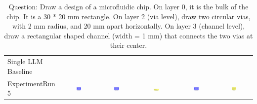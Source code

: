 \begin{table}
\begin{tabular}{@{}lccccc@{}}
    Single LLM Baseline \\
    ExperimentRun 5 & \includegraphics[width=0.15\textwidth]{./run_5/png/gpt-4o_results/MicrofluidicChip.png} & \includegraphics[width=0.15\textwidth]{./run_5/png/o1-preview_results/MicrofluidicChip.png} & \includegraphics[width=0.15\textwidth]{./run_5/png/claude-3-5-sonnet-20240620_results/MicrofluidicChip.png} & \includegraphics[width=0.15\textwidth]{./run_5/png/watsonx_meta-llama_llama-3-1-70b-instruct_results/MicrofluidicChip.png} & \includegraphics[width=0.15\textwidth]{./run_5/png/watsonx_meta-llama_llama-3-405b-instruct_results/MicrofluidicChip.png} \\
    \bottomrule
  \end{tabular}
  \caption*{Question: Draw a design of a microfluidic chip. On layer 0, it is the bulk of the chip. It is a 30 * 20 mm rectangle. On layer 2 (via level), draw two circular vias, with 2 mm radius, and 20 mm apart horizontally. On layer 3 (channel level), draw a rectangular shaped channel (width = 1 mm) that connects the two vias at their center.}
\end{table}


